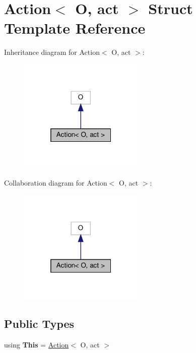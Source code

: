 \hypertarget{structAction}{}\section{Action$<$ O, act $>$ Struct Template Reference}
\label{structAction}


Inheritance diagram for Action$<$ O, act $>$\+:\nopagebreak
\begin{figure}[H]
\begin{center}
\leavevmode
\includegraphics[width=169pt]{structAction__inherit__graph}
\end{center}
\end{figure}


Collaboration diagram for Action$<$ O, act $>$\+:\nopagebreak
\begin{figure}[H]
\begin{center}
\leavevmode
\includegraphics[width=169pt]{structAction__coll__graph}
\end{center}
\end{figure}
\subsection*{Public Types}
\begin{DoxyCompactItemize}
\item 
\mbox{\label{structAction_a87eb8d92b4c19bfb26549de3d1f9675d}} 
using {\bfseries This} = \hyperlink{structAction}{Action}$<$ O, act $>$
\end{DoxyCompactItemize}
